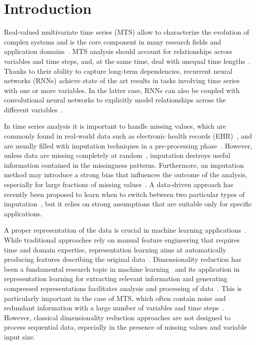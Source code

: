 \documentclass[a4paper,10pt,pdftex]{article}
\begin{document}
\section{Introduction}

Real-valued multivariate time series (MTS) allow to characterize the evolution of complex systems and is the core component in many research fields and application domains~\cite{chatfield2016analysis, 7765110}.
MTS analysis should account for relationships across variables and time steps, and, at the same time, deal with unequal time lengths~\cite{langkvist2014review, JAIN201935, OREGI2019506}.
Thanks to their ability to capture long-term dependencies, recurrent neural networks (RNNs) achieve state of the art results in tasks involving time series with one or more variables. 
In the latter case, RNNs can also be coupled with convolutional neural networks to explicitly model relationships across the different variables~\cite{song2018deep}.

In time series analysis it is important to handle missing values, which are commonly found in real-world data such as electronic health records (EHR)~\cite{che2017time, DING2012919}, and are usually filled with imputation techniques in a pre-processing phase~\cite{FARHANGFAR20083692}.
However, unless data are missing completely at random~\cite{heitjan1996distinguishing}, imputation destroys useful information contained in the missingness patterns.
Furthermore, an imputation method may introduce a strong bias that influences the outcome of the analysis, especially for large fractions of missing values~\cite{little2014statistical}.
A data-driven approach has recently been proposed to learn when to switch between two particular types of imputation~\cite{Che2018}, but it relies on strong assumptions that are suitable only for specific applications.

A proper representation of the data is crucial in machine learning applications~\cite{LI20153542}.
While traditional approaches rely on manual feature engineering that requires time and domain expertise, representation learning aims at automatically producing features describing the original data~\cite{bengio2013representation}. 
Dimensionality reduction has been a fundamental research topic in machine learning~\cite{jenssen2010kernel, harandi2017dimensionality, MIKALSEN2019257} and its application in representation learning for extracting relevant information and generating compressed representations facilitates analysis and processing of data~\cite{langkvist2014review, WANG201955, TUNCEL2018202}.
This is particularly important in the case of MTS, which often contain noise and redundant information with a large number of variables and time steps~\cite{TUNCEL2018202}.
However, classical dimensionality reduction approaches are not designed to process sequential data, especially in the presence of missing values and variable input size. 
\end{document}

